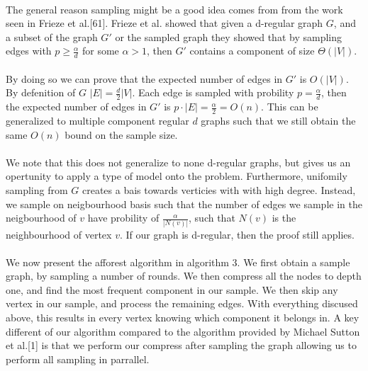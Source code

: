 \documentclass[]{article}
\begin{document}
\paragraph{}
The general reason sampling might be a good idea comes from from the work seen in Frieze et al.[61].
Frieze et al. showed that given a d-regular graph $G$, and a subset of the graph $G'$ or the sampled graph they showed that by sampling edges with $p \ge \frac{\alpha}{d}$ for some $\alpha > 1$, then $G'$ contains a component of size $\Theta(|V|)$. 

\paragraph{}
By doing so we can prove that the expected number of edges in $G'$ is $O(|V|)$.
By defenition of $G$ $|E| = \frac{d}{2}|V|$. Each edge is sampled with probility $p=\frac{\alpha}{d}$, then the expected number of edges in $G'$ is $p\cdot |E| = \frac{\alpha}{2} = O(n)$. This can be generalized to multiple component regular $d$ graphs such that we still obtain the same $O(n)$ bound on the sample size. 

\paragraph{}
We note that this does not generalize to none d-regular graphs, but gives us an opertunity to apply a type of model onto the problem. Furthermore, unifomily sampling from $G$ creates a bais towards verticies with with high degree. Instead, we sample on neigbourhood basis such that the number of edges we sample in the neigbourhood of $v$ have probility of $\frac{\alpha}{|N(v)|}$, such that $N(v)$ is the neighbourhood of vertex $v$. If our graph is d-regular, then the proof still applies.

\paragraph{}
We now present the afforest algorithm in algorithm 3. We first obtain a sample graph, by sampling a number of rounds. We then compress all the nodes to depth one, and find the most frequent component in our sample. We then skip any vertex in our sample, and process the remaining edges. With everything discused above, this results in every vertex knowing which component it belongs in. A key different of our algorithm compared to the algorithm provided by Michael Sutton et al.[1] is that we perform our compress after sampling the graph allowing us to perform all sampling in parrallel.
\end{document}
